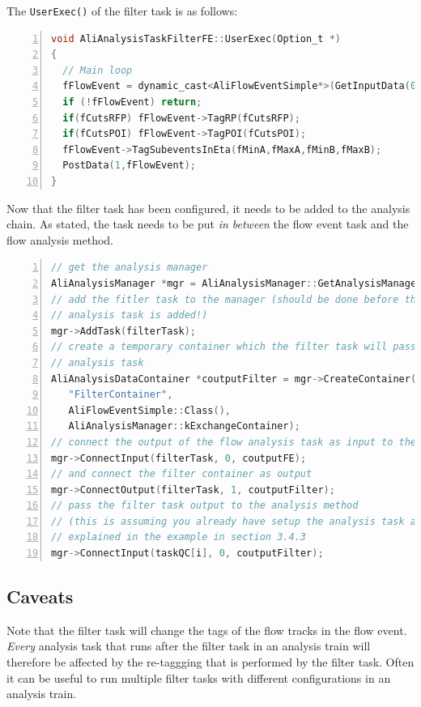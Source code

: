 \documentclass[a4paper]{book}
\numberwithin{equation}{subsection}
\begin{document}
The \texttt{UserExec()} of the filter task is as follows:
\begin{lstlisting}[language=C, numbers=left]
void AliAnalysisTaskFilterFE::UserExec(Option_t *)
{
  // Main loop
  fFlowEvent = dynamic_cast<AliFlowEventSimple*>(GetInputData(0)); // from TaskSE
  if (!fFlowEvent) return;
  if(fCutsRFP) fFlowEvent->TagRP(fCutsRFP);
  if(fCutsPOI) fFlowEvent->TagPOI(fCutsPOI);
  fFlowEvent->TagSubeventsInEta(fMinA,fMaxA,fMinB,fMaxB);
  PostData(1,fFlowEvent);
}\end{lstlisting}

Now that the filter task has been configured, it needs to be added to the analysis chain. As stated, the task needs to be put \emph{in between} the flow event task and the flow analysis method. 
\begin{lstlisting}[numbers=left, language=C]
// get the analysis manager
AliAnalysisManager *mgr = AliAnalysisManager::GetAnalysisManager();
// add the fitler task to the manager (should be done before the
// analysis task is added!)
mgr->AddTask(filterTask);
// create a temporary container which the filter task will pass to the 
// analysis task
AliAnalysisDataContainer *coutputFilter = mgr->CreateContainer(
   "FilterContainer",
   AliFlowEventSimple::Class(),
   AliAnalysisManager::kExchangeContainer);
// connect the output of the flow analysis task as input to the filter task
mgr->ConnectInput(filterTask, 0, coutputFE);
// and connect the filter container as output
mgr->ConnectOutput(filterTask, 1, coutputFilter);
// pass the filter task output to the analysis method   
// (this is assuming you already have setup the analysis task as
// explained in the example in section 3.4.3
mgr->ConnectInput(taskQC[i], 0, coutputFilter);\end{lstlisting}
\subsection{Caveats}
Note that the filter task will change the tags of the flow tracks in the flow event. \emph{Every} analysis task that runs after the filter task in an analysis train will therefore be affected by the re-taggging that is performed by the filter task. Often it can be useful to run multiple filter tasks with different configurations in an analysis train. 
\end{document}
